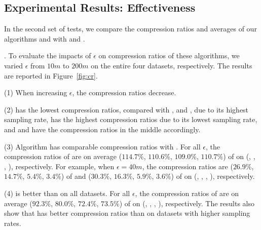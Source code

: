 \subsection{Experimental Results: Effectiveness}
In the second set of tests, we compare the compression ratios and averages of our algorithms \cist and \cista with \dpa and \squishe.



.
To evaluate the impacts of $\epsilon$ on compression ratios of these algorithms, we varied $\epsilon$ from $10m$ to $200m$ on
 the entire four datasets, respectively.
The results are reported in Figure~\ref{fig:cr}.

\ni (1) When increasing $\epsilon$, the compression ratios decrease.


\ni (2) \pricar has the lowest compression ratios, compared with \truck, \sercar and \geolife, due to its highest sampling rate,
\truck has the highest compression ratios due to its lowest sampling rate, and \sercar and \geolife have the compression ratios in the middle accordingly.

\ni (3) Algorithm \cist has \textcolor[rgb]{1.00,0.00,0.00}{comparable} compression ratios with \dpa.
For all $\epsilon$, the compression ratios of \cist are on average ($114.7\%$, $110.6\%$, $109.0\%$, $110.7\%$) of \dpa on (\truck, \sercar, \geolife, \pricar), respectively.
For example, when $\epsilon = 40m$, the compression ratios are ($26.9\%$, $14.7\%$, $5.4\%$, $3.4\%$) of \dpa and ($30.3\%$, $16.3\%$, $5.9\%$, $3.6\%$) of \cist on (\truck, \sercar, \geolife, \pricar), respectively.

\ni (4) \cist is better than  \squishe on all datasets.
For all $\epsilon$, the compression ratios of \cist are on average ($92.3\%$, $80.0\%$, $72.4\%$, {$73.5\%$}) of \squishe on (\truck, \sercar, \geolife, \pricar), respectively.
The results also show that \cist has better compression ratios than \squishe on datasets with higher sampling rates.




